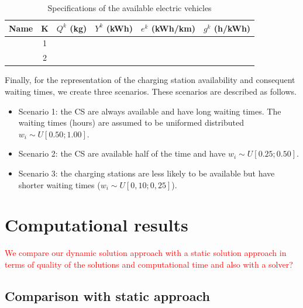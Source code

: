 \documentclass[11pt]{article}
\begin{document}
\begin{table}[H]
	\begin{center}
	\begin{tabular}{c c c c c c}
	\toprule
	Name & K & $Q^k$ (kg) &  $Y^k$ (kWh) & $e^k$ (kWh/km) & $g^k$ (h/kWh)\\ \midrule
	& 1 & & & & \\
	& 2 & & & & \\
	\bottomrule
	\end{tabular}
	\end{center}
\caption{Specifications of the available electric vehicles}
\label{table:vehicles}
\end{table}

Finally, for the representation of the charging station availability and consequent waiting times, we create three scenarios. These scenarios are described as follows.
\begin{itemize}
\item Scenario 1: the CS are always available and have long waiting times. The waiting times (hours) are assumed to be uniformed distributed $w_i \sim U[0.50;1.00]$. 
\item Scenario 2: the CS are available half of the time and have $w_i \sim U[0.25;0.50]$. 
\item Scenario 3: the charging stations are less likely to be available but have shorter waiting times ($w_i \sim U[0,10;0,25]$).
\end{itemize}


\section{Computational results}
\label{section:results}
\textcolor{red}{We compare our dynamic solution approach with a static solution approach in terms of quality of the solutions and computational time and also with a solver?}

\subsection{Comparison with static approach}

\end{document}
